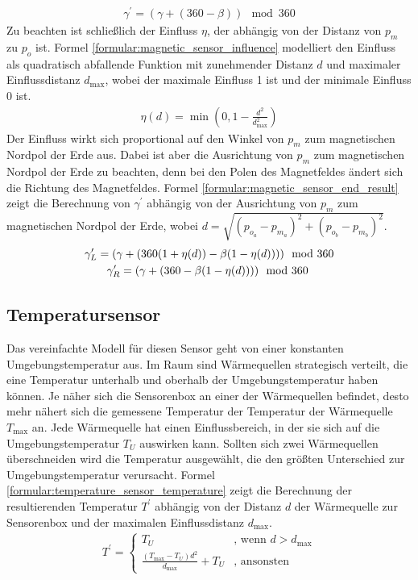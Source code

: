 \begin{align}
    \label{formular:magnetic_sensor_new_heading}
    \gamma^{\prime} = (\gamma + (360 - \beta))\mod 360
\end{align}
\newpage
Zu beachten ist schließlich der Einfluss $\eta$, der abhängig von der Distanz von $p_{m}$ zu $p_{o}$ ist.
Formel \ref{formular:magnetic_sensor_influence} modelliert den Einfluss als quadratisch abfallende Funktion mit zunehmender Distanz $d$ und maximaler Einflussdistanz $d_{\max}$,
wobei der maximale Einfluss 1 ist und der minimale Einfluss 0 ist.
\begin{align}
    \label{formular:magnetic_sensor_influence}
    \eta(d) = \min(0, 1 - \frac{d^2}{d_{\max}^2})
\end{align}
Der Einfluss wirkt sich proportional auf den Winkel von $p_{m}$ zum magnetischen Nordpol der Erde aus.
Dabei ist aber die Ausrichtung von $p_{m}$ zum magnetischen Nordpol der Erde zu beachten, denn bei den Polen des Magnetfeldes ändert sich die Richtung des Magnetfeldes.
Formel \ref{formular:magnetic_sensor_end_result} zeigt die Berechnung von $\gamma^{\prime}$ abhängig von der Ausrichtung von $p_{m}$ zum magnetischen Nordpol der Erde,
wobei $d = \sqrt{(p_{o_a} - p_{m_a})^2 + (p_{o_b} - p_{m_b})^2}$.
\begin{align}
    \label{formular:magnetic_sensor_end_result}
    \gamma^{\prime}_L = (\gamma + (360(1 + \eta(d)) - \beta(1 - \eta(d))))\mod 360 \\\nonumber
    \gamma^{\prime}_R = (\gamma + (360 - \beta(1 - \eta(d))))\mod 360 \hspace{0.8cm}
\end{align}

\subsection{Temperatursensor}
Das vereinfachte Modell für diesen Sensor geht von einer konstanten Umgebungstemperatur aus.
Im Raum sind Wärmequellen strategisch verteilt, die eine Temperatur unterhalb und oberhalb der Umgebungstemperatur haben können.
Je näher sich die Sensorenbox an einer der Wärmequellen befindet, desto mehr nähert sich die gemessene Temperatur der Temperatur der Wärmequelle $T_{\max}$ an.
\newline
\newline
Jede Wärmequelle hat einen Einflussbereich, in der sie sich auf die Umgebungstemperatur $T_U$ auswirken kann.
Sollten sich zwei Wärmequellen überschneiden wird die Temperatur ausgewählt, die den größten Unterschied zur Umgebungstemperatur verursacht.
Formel \ref{formular:temperature_sensor_temperature} zeigt die Berechnung der resultierenden Temperatur $T^{\prime}$ abhängig von der Distanz $d$ der
Wärmequelle zur Sensorenbox und der maximalen Einflussdistanz $d_{\max}$.
\begin{align}
    \label{formular:temperature_sensor_temperature}
    T^{\prime} = \begin{cases}
                     T_U & \text{, wenn } d > d_{\max} \\
                     \frac{(T_{\max} - T_U)d^2}{d_{\max}} + T_U & \text{, ansonsten}
    \end{cases}
\end{align}

